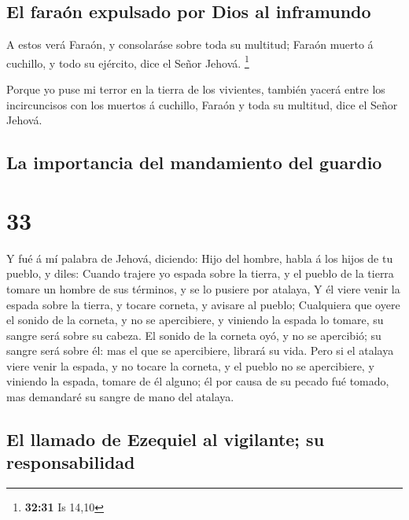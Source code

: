 \hypertarget{el-farauxf3n-expulsado-por-dios-al-inframundo}{%
\subsection{El faraón expulsado por Dios al
inframundo}\label{el-farauxf3n-expulsado-por-dios-al-inframundo}}

 A estos verá Faraón, y consolaráse sobre toda su multitud;
Faraón muerto á cuchillo, y todo su ejército, dice el Señor Jehová.
\footnote{\textbf{32:31} Is 14,10}

 Porque yo puse mi terror en la tierra de los vivientes,
también yacerá entre los incircuncisos con los muertos á cuchillo,
Faraón y toda su multitud, dice el Señor Jehová.

\hypertarget{la-importancia-del-mandamiento-del-guardio}{%
\subsection{La importancia del mandamiento del
guardio}\label{la-importancia-del-mandamiento-del-guardio}}

\hypertarget{section-32}{%
\section{33}\label{section-32}}

 Y fué á mí palabra de Jehová, diciendo:  Hijo
del hombre, habla á los hijos de tu pueblo, y diles: Cuando trajere yo
espada sobre la tierra, y el pueblo de la tierra tomare un hombre de sus
términos, y se lo pusiere por atalaya,  Y él viere venir la
espada sobre la tierra, y tocare corneta, y avisare al pueblo;
 Cualquiera que oyere el sonido de la corneta, y no se
apercibiere, y viniendo la espada lo tomare, su sangre será sobre su
cabeza.  El sonido de la corneta oyó, y no se apercibió; su
sangre será sobre él: mas el que se apercibiere, librará su vida.
 Pero si el atalaya viere venir la espada, y no tocare la
corneta, y el pueblo no se apercibiere, y viniendo la espada, tomare de
él alguno; él por causa de su pecado fué tomado, mas demandaré su sangre
de mano del atalaya.

\hypertarget{el-llamado-de-ezequiel-al-vigilante-su-responsabilidad}{%
\subsection{El llamado de Ezequiel al vigilante; su
responsabilidad}\label{el-llamado-de-ezequiel-al-vigilante-su-responsabilidad}}


